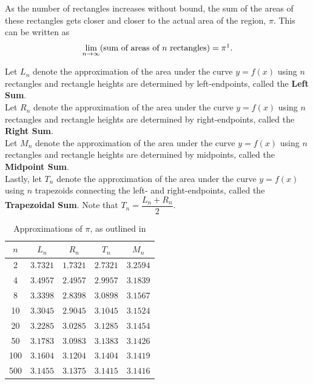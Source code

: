 \documentclass{book}
\begin{document}
\begin{Exam}
As the number of rectangles increases without bound, the sum of the areas of these rectangles gets closer and closer to the actual area of the region, $\pi$. This can be written as \[\lim_{n\to \infty} (\mbox{sum of areas of $n$ rectangles}) = \pi\footnotemark.   \]
\end{Exam}\vs

\begin{Def} Let $L_n$ denote the approximation of the area under the curve $y=f(x)$ using $n$ rectangles and rectangle heights are determined by left-endpoints, called the \textbf{Left Sum}.  \\

Let $R_n$ denote the approximation of the area under the curve $y=f(x)$ using $n$ rectangles and rectangle heights are determined by right-endpoints, called the \textbf{Right Sum}. \\

Let $M_n$ denote the approximation of the area under the curve $y=f(x)$ using $n$ rectangles and rectangle heights are determined by midpoints, called the \textbf{Midpoint Sum}. \\

Lastly, let $T_n$ denote the approximation of the area under the curve $y=f(x)$ using $n$ trapezoids connecting the left- and right-endpoints, called the \textbf{Trapezoidal Sum}. Note that $T_n= \dfrac{L_n+R_n}{2}$. 
\end{Def}\vs

\begin{table}[h]
\begin{center}
\begin{tabular}{c|c|c|c|c}
$n$ & $L_n$ & $R_n$ & $T_n$ & $M_n$ \\ \hline
2 & $3.7321$ & $1.7321$ & $2.7321$ & $3.2594$ \\ 
4 & $3.4957$ & $2.4957$ & $2.9957$ & $3.1839$ \\ 
8 & $3.3398$ & $2.8398$ & $3.0898$ & $3.1567$ \\ 
10 & $3.3045$ & $2.9045$ & $3.1045$ & $3.1524$ \\ 
20 & $3.2285$ & $3.0285$ & $3.1285$ & $3.1454$ \\ 
50 & $3.1783$ & $3.0983$ & $3.1383$ & $3.1426$ \\ 
100 & $3.1604$ & $3.1204$ & $3.1404$ & $3.1419$ \\ 
500 & $3.1455$ & $3.1375$ & $3.1415$ & $3.1416$ \\ 
\end{tabular}
\end{center}
\caption{Approximations of $\pi$, as outlined in  }\label{table:circle}
\end{table}
\end{document}
